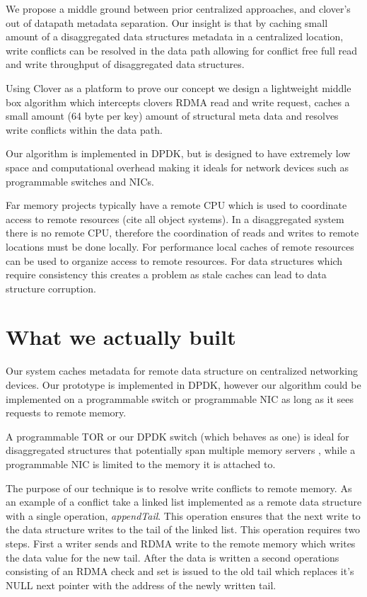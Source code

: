 
We propose a middle ground between prior centralized approaches, and
clover's out of datapath metadata separation. Our insight is that by
caching small amount of a disaggregated data structures metadata in a
centralized location, write conflicts can be resolved in the data path
allowing for conflict free full read and write throughput of
disaggregated data structures.

Using Clover as a platform to prove our concept we design a
lightweight middle box algorithm which intercepts clovers RDMA read
and write request, caches a small amount (64 byte per key) amount of
structural meta data and resolves write conflicts within the data
path. 

Our algorithm is implemented in DPDK, but is designed to have
extremely low space and computational overhead making it ideals for
network devices such as programmable switches and NICs.



\pagebreak


Far memory projects typically have a remote CPU which is used to
coordinate access to remote resources (cite all object systems). In a
disaggregated system there is no remote CPU, therefore the coordination
of reads and writes to remote locations must be done locally. For
performance local caches of remote resources can be used to organize
access to remote resources. For data structures which require
consistency this creates a problem as stale caches can lead to data
structure corruption.

\section{What we actually built}

Our system caches metadata for remote data structure on centralized
networking devices. Our prototype is implemented in DPDK, however our
algorithm could be implemented on a programmable switch or
programmable NIC as long as it sees requests to remote memory. 

A programmable TOR or our DPDK switch (which behaves as one) is ideal
for disaggregated structures that potentially span multiple memory
servers , while a programmable NIC is limited to the memory it is
attached to. 

The purpose of our technique is to resolve write conflicts to remote
memory. As an example of a conflict take a linked list implemented as
a remote data structure with a single operation, \textit{appendTail}.
This operation ensures that the next write to the data structure writes
to the tail of the linked list. This operation requires two steps.
First a writer sends and RDMA write to the remote memory which writes
the data value for the new tail. After the data is written a second
operations consisting of an RDMA check and set is issued to the old
tail which replaces it's NULL next pointer with the address of the
newly written tail.

